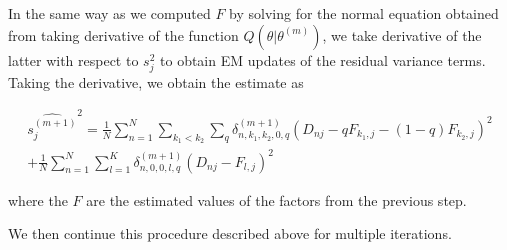 \documentclass[11pt,authoryear]{article}
\begin{document}
In the same way as we computed $F$ by solving for the normal equation obtained from taking derivative of the function $Q (\theta | \theta^{(m)})$, we take derivative of the latter with respect to $s^2_{j}$ to obtain EM updates of the residual variance terms. Taking the derivative, we obtain the estimate as 

\begin{multline}
\widehat{s_{j}^{(m+1)}}^2 = \frac{1}{N}\sum_{n=1}^{N} \sum_{k_1 < k_2} \sum_{q} \delta^{(m+1)}_{n, k_1, k_2, 0, q} (D_{nj} - q F_{k_1,j} - (1-q) F_{k_2,j})^2 \\
+  \frac{1}{N}\sum_{n=1}^{N} \sum_{l=1}^{K} \delta^{(m+1)}_{n, 0, 0, l, q} (D_{nj} - F_{l,j} )^2
\end{multline}

where the $F$ are the estimated values of the factors from the previous step.

We then continue this procedure described above for multiple iterations.
\end{document}
